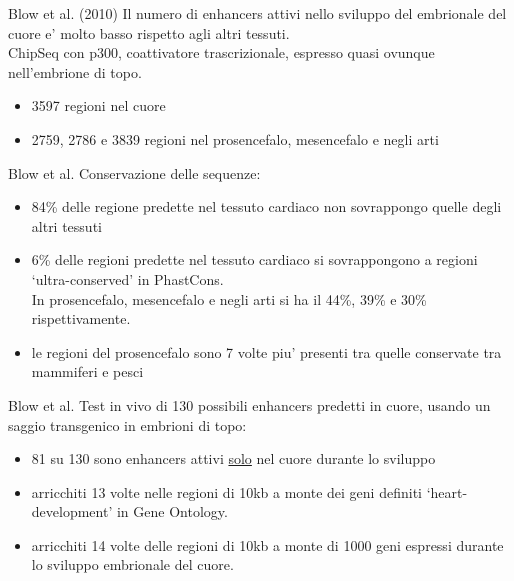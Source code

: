 \documentclass{beamer}
\begin{document}
    \begin{frame}[plain]{Blow et al. (2010)}
        Il numero di enhancers attivi nello sviluppo del embrionale del cuore
        e' molto basso rispetto agli altri tessuti.\\
        ChipSeq con p300, coattivatore trascrizionale, espresso quasi
        ovunque nell'embrione di topo.
        \begin{itemize}
            \item 3597 regioni nel cuore
            \item 2759, 2786 e 3839 regioni nel prosencefalo,
            mesencefalo e negli arti
        \end{itemize}
    \end{frame}


    \begin{frame}[plain]{Blow et al.}
        Conservazione delle sequenze:
        \begin{itemize}
            \item 84\% delle regione predette nel tessuto cardiaco non sovrappongo quelle degli altri tessuti
            \item 6\% delle regioni predette nel tessuto cardiaco si sovrappongono a regioni `ultra-conserved'
            in PhastCons.\\
            In prosencefalo, mesencefalo e negli arti si ha il 44\%, 39\% e 30\% rispettivamente.
            \item le regioni del prosencefalo sono 7 volte piu' presenti tra quelle conservate
            tra mammiferi e pesci
        \end{itemize}
    \end{frame}


    \begin{frame}[plain]{Blow et al.}
        Test in vivo di 130 possibili enhancers predetti in cuore,
        usando un saggio transgenico in embrioni di topo:
        \begin{itemize}
            \item 81 su 130 sono enhancers attivi \underline{solo} nel cuore durante lo sviluppo
            \item arricchiti 13 volte nelle regioni di 10kb a monte dei geni definiti
            `heart-development' in Gene Ontology.
            \item arricchiti 14 volte delle regioni di 10kb a monte di 1000 geni espressi
            durante lo sviluppo embrionale del cuore.
        \end{itemize}
    \end{frame}
\end{document}

